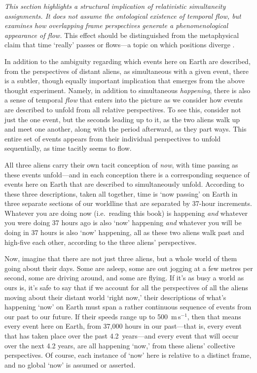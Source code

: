 \documentclass[12pt]{book}
\begin{document}
\vspace{4pt}

\textit{This section highlights a structural implication of relativistic simultaneity assignments. It does not assume the ontological existence of temporal flow, but examines how overlapping frame perspectives generate a phenomenological appearance of flow.} This effect should be distinguished from the metaphysical claim that time `really' passes or flows---a topic on which positions diverge \citep{williams1951,ellis2014}.

In addition to the ambiguity regarding which events here on Earth are described, from the perspectives of distant aliens, as simultaneous with a given event, there is a subtler, though equally important implication that emerges from the above thought experiment. Namely, in addition to simultaneous \textit{happening}, there is also a sense of temporal \textit{flow} that enters into the picture as we consider how events are described to unfold from all relative perspectives. To see this, consider not just the one event, but the seconds leading up to it, as the two aliens walk up and meet one another, along with the period afterward, as they part ways. This entire set of events appears from their individual perspectives to unfold sequentially, as time tacitly seems to flow.

All three aliens carry their own tacit conception of \textit{now}, with time passing as these events unfold---and in each conception there is a corresponding sequence of events here on Earth that are described to simultaneously unfold. According to these three descriptions, taken all together, time is `now passing' on Earth in three separate sections of our worldline that are separated by 37-hour increments. Whatever you are doing now (i.e.\ reading this book) is happening \textit{and} whatever you were doing 37 hours ago is also `now' happening \textit{and} whatever you will be doing in 37 hours is also `now' happening, all as these two aliens walk past and high-five each other, according to the three aliens' perspectives.

Now, imagine that there are not just three aliens, but a whole world of them going about their days. Some are asleep, some are out jogging at a few metres per second, some are driving around, and some are flying. If it's as busy a world as ours is, it's safe to say that if we account for all the perspectives of all the aliens moving about their distant world `right now,' their descriptions of what's happening `now' on Earth must span a rather continuous sequence of events from our past to our future. If their speeds range up to 500~m\,s$^{-1}$, then that means every event here on Earth, from 37,000 hours in our past---that is, every event that has taken place over the past 4.2~years---and every event that will occur over the next 4.2 years, are all happening `now,' from these aliens' collective perspectives. Of course, each instance of `now' here is relative to a distinct frame, and no global `now' is assumed or asserted.
\end{document}
